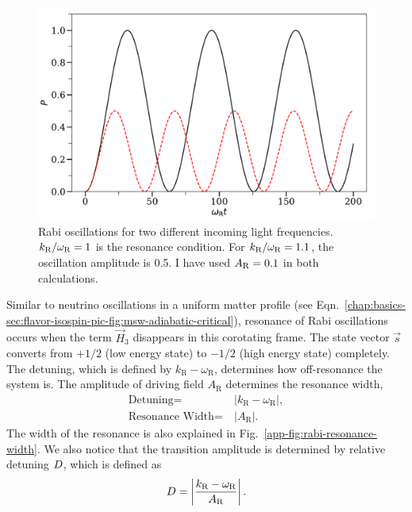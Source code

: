 \begin{figure}[htbp]
    \centering
    \includegraphics[width=\textwidth]{chapters/assets/app/rabi-oscillations}
    \caption{Rabi oscillations for two different incoming light frequencies. $k_\mathrm R/\omega_\mathrm R=1$ is the resonance condition. For $k_\mathrm R/\omega_\mathrm R=1.1$,  the oscillation amplitude is 0.5. I have used $A_\mathrm R=0.1$ in both calculations. }
    \label{app-fig:rabi-examples}
\end{figure}

Similar to neutrino oscillations in a uniform matter profile (see Eqn.~\ref{chap:basics-sec:flavor-isospin-pic-fig:msw-adiabatic-critical}), resonance of Rabi oscillations occurs when the term $\vec{H}_3$ disappears in this corotating frame. The state vector $\vec{s}$ converts from $+1/2$ (low energy state) to $-1/2$ (high energy state) completely. The detuning, which is defined by $k_{\mathrm{R}} - \omega_{\mathrm R}$, determines how off-resonance the system is. The amplitude of driving field $A_{\mathrm{R}}$ determines the resonance width,
\begin{align}
\text{Detuning} =&~\lvert k_{\mathrm{R}} - \omega_{\mathrm R} \rvert, \\
\text{Resonance Width} =&~\lvert A_{\mathrm R} \rvert.
\end{align}
The width of the resonance is also explained in Fig.~\ref{app-fig:rabi-resonance-width}. We also notice that the transition amplitude is determined by relative detuning $D$, which is defined as
\begin{equation}
    D = \left\lvert \frac{ k_{\mathrm R} - \omega_{\mathrm R}}{A_{\mathrm R}} \right\rvert.
\end{equation}

